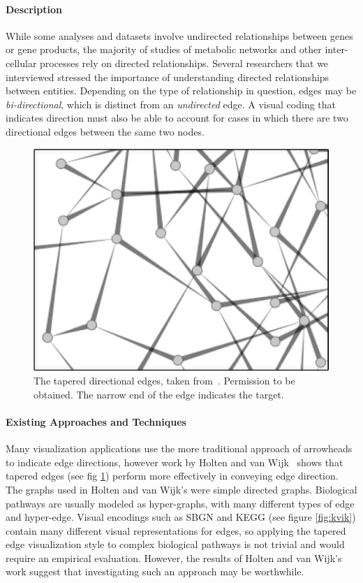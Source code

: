 \paragraph*{Description}
While some analyses and datasets involve undirected relationships between genes or gene products, the majority of studies of metabolic networks and other inter-cellular processes rely on directed relationships.
Several researchers that we interviewed stressed the importance of understanding directed relationships between entities.
Depending on the type of relationship in question, edges may be \textit{bi-directional}, which is distinct from an \textit{undirected} edge.
A visual coding that indicates direction must also be able to account for cases in which there are two directional edges between the same two nodes.
\begin{figure}[htb]
  \centering
  \includegraphics[width=0.8\columnwidth]{figures/tapered_edges}
  \caption{\label{fig:tapered_edges} The tapered directional edges, taken from~\cite{Holten2009}. Permission to be obtained. The narrow end of the edge indicates the target.}
\end{figure}

\paragraph*{Existing Approaches and Techniques}
Many visualization applications use the more traditional approach of arrowheads to indicate edge directions, however work by Holten and van Wijk~\cite{Holten2009} shows that tapered edges (see fig \ref{fig:tapered_edges}) perform more effectively in conveying edge direction. The graphs used in Holten and van Wijk's were simple directed graphs. Biological pathways are usually modeled as hyper-graphs, with many different types of edge and hyper-edge. Visual encodings such as SBGN and KEGG (see figure \ref{fig:kvik}) contain many different visual representations for edges, so applying the tapered edge visualization style to complex biological pathways is not trivial and would require an empirical evaluation. However, the results of Holten and van Wijk's work suggest that investigating such an approach may be worthwhile.

